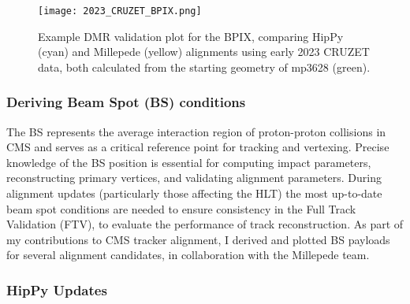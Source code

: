 \begin{figure}[!hbt]
    \begin{center}
        \texttt{[image: 2023\_CRUZET\_BPIX.png]}
        \caption{Example DMR validation plot for the BPIX, comparing HipPy (cyan) and Millepede (yellow) alignments using early 2023 CRUZET data, both calculated from the starting geometry of mp3628 (green).}
        \label{fig:2023_CRUZET_BPIX}
    \end{center}
\end{figure}






\subsubsection{Deriving Beam Spot (BS) conditions}

The BS represents the average interaction region of proton-proton collisions in CMS and serves as a critical reference point for tracking and vertexing. Precise knowledge of the BS position is essential for computing impact parameters, reconstructing primary vertices, and validating alignment parameters. During alignment updates (particularly those affecting the HLT) the most up-to-date beam spot conditions are needed to ensure consistency in the Full Track Validation (FTV), to evaluate the performance of track reconstruction. As part of my contributions to CMS tracker alignment, I derived and plotted BS payloads for several alignment candidates, in collaboration with the Millepede team.

\subsubsection{HipPy Updates}

